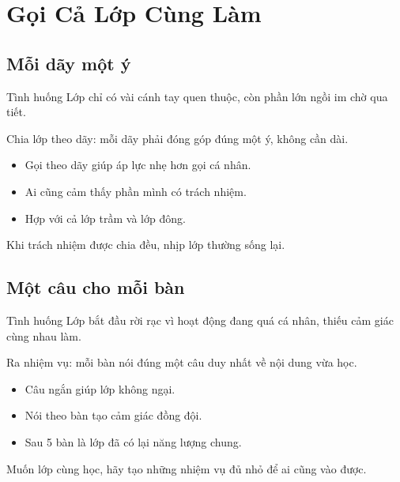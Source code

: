 \chapter{Gọi Cả Lớp Cùng Làm}

\section{Mỗi dãy một ý}
\begin{tinhhuong}{Tình huống}
Lớp chỉ có vài cánh tay quen thuộc, còn phần lớn ngồi im chờ qua tiết.
\end{tinhhuong}
\begin{goiydungngay}
Chia lớp theo dãy: mỗi dãy phải đóng góp đúng một ý, không cần dài.
\begin{itemize}
\item Gọi theo dãy giúp áp lực nhẹ hơn gọi cá nhân.
\item Ai cũng cảm thấy phần mình có trách nhiệm.
\item Hợp với cả lớp trầm và lớp đông.
\end{itemize}
\end{goiydungngay}
\begin{cauchot}
Khi trách nhiệm được chia đều, nhịp lớp thường sống lại.
\end{cauchot}
\ngancach

\section{Một câu cho mỗi bàn}
\begin{tinhhuong}{Tình huống}
Lớp bắt đầu rời rạc vì hoạt động đang quá cá nhân, thiếu cảm giác cùng nhau làm.
\end{tinhhuong}
\begin{goiydungngay}
Ra nhiệm vụ: mỗi bàn nói đúng một câu duy nhất về nội dung vừa học.
\begin{itemize}
\item Câu ngắn giúp lớp không ngại.
\item Nói theo bàn tạo cảm giác đồng đội.
\item Sau 5 bàn là lớp đã có lại năng lượng chung.
\end{itemize}
\end{goiydungngay}
\begin{cauchot}
Muốn lớp cùng học, hãy tạo những nhiệm vụ đủ nhỏ để ai cũng vào được.
\end{cauchot}
\ngancach

